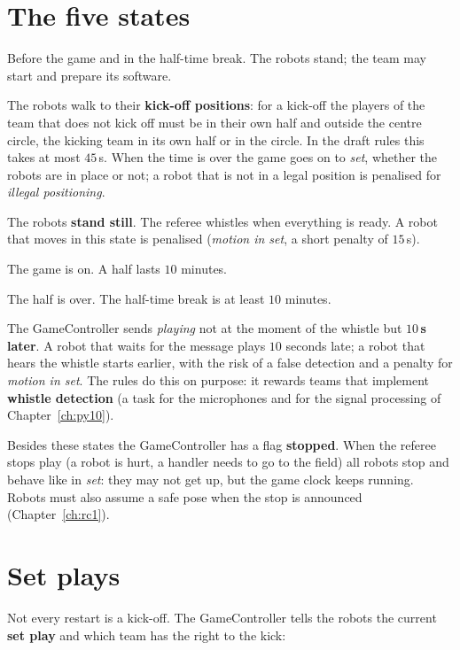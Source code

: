 \section*{The five states}
\begin{description}[leftmargin=2.2cm,style=nextline]
 \item[initial] Before the game and in the half-time break. The robots stand; the team may start and prepare its software.
 \item[ready] The robots walk to their \textbf{kick-off positions}: for a kick-off the players of the team that does not kick off must be in their own half and outside the centre circle, the kicking team in its own half or in the circle. In the draft rules this takes at most $45$\,s. When the time is over the game goes on to \emph{set}, whether the robots are in place or not; a robot that is not in a legal position is penalised for \emph{illegal positioning}.
 \item[set] The robots \textbf{stand still}. The referee whistles when everything is ready. A robot that moves in this state is penalised (\emph{motion in set}, a short penalty of $15$\,s).
 \item[playing] The game is on. A half lasts $10$ minutes.
 \item[finished] The half is over. The half-time break is at least $10$ minutes.
\end{description}
The GameController sends \emph{playing} not at the moment of the whistle but \textbf{$10$\,s later}. A robot that waits for the message plays $10$ seconds late; a robot that hears the whistle starts earlier, with the risk of a false detection and a penalty for \emph{motion in set}. The rules do this on purpose: it rewards teams that implement \textbf{whistle detection} (a task for the microphones and for the signal processing of Chapter~\ref{ch:py10}).

Besides these states the GameController has a flag \textbf{stopped}. When the referee stops play (a robot is hurt, a handler needs to go to the field) all robots stop and behave like in \emph{set}: they may not get up, but the game clock keeps running. Robots must also assume a safe pose when the stop is announced (Chapter~\ref{ch:rc1}).

\section*{Set plays}
Not every restart is a kick-off. The GameController tells the robots the current \textbf{set play} and which team has the right to the kick:

